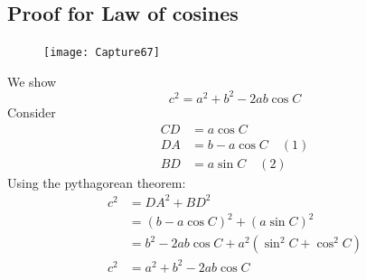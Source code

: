 \documentclass{report}
\begin{document}
\subsection{Proof for Law of cosines} %
\begin{figure}[h]
\texttt{[image: Capture67]}\\
\centering
\end{figure}
\noindent We show
\begin{equation*}
c^2=a^2+b^2-2ab\cos C
\end{equation*}
Consider
\begin{align*}
CD&=a\cos C\\
DA&=b-a\cos C\quad(1)\\
BD&=a\sin C\quad(2)
\end{align*}
Using the pythagorean theorem:
\begin{align*}
c^2&=DA^2+BD^2\\
&=(b-a\cos C)^2+(a\sin C)^2\\
&=b^2-2ab\cos C+a^2(\sin^2C+\cos^2C)\\
c^2&=a^2+b^2-2ab\cos C
\end{align*}
\newpage
\end{document}
